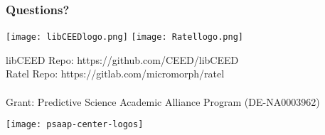 \documentclass{beamer}
\begin{document}

\begin{frame}
\frametitle{Questions?}

\begin{center}
\texttt{[image: libCEEDlogo.png]}
\texttt{[image: Ratellogo.png]}
\end{center}

{\flushleft

libCEED Repo: https://github.com/CEED/libCEED\\
Ratel Repo: https://gitlab.com/micromorph/ratel\\

~\\

Grant: Predictive Science Academic Alliance Program (DE-NA0003962)\\

}

\begin{center}
\texttt{[image: psaap-center-logos]}
\end{center}

\end{frame}

\end{document}
